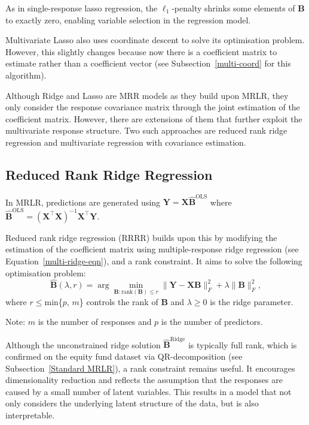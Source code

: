 \documentclass[11pt]{report} %
\begin{document}
\noindent As in single-response lasso regression, the \(\ell_1\)-penalty shrinks some elements of \(\mathbf{B}\) to exactly zero, enabling variable selection in the regression model.

Multivariate Lasso also uses coordinate descent to solve its optimisation problem. However, this slightly changes because now there is a coefficient matrix to estimate rather than a coefficient vector (see Subsection~\ref{multi-coord} for this algorithm).

Although Ridge and Lasso are MRR models as they build upon MRLR, they only consider the response covariance matrix through the joint estimation of the coefficient matrix. However, there are extensions of them that further exploit the multivariate response structure. Two such approaches are reduced rank ridge regression and multivariate regression with covariance estimation.

\subsection{Reduced Rank Ridge Regression}
In MRLR, predictions are generated using $\mathbf{Y}=\mathbf{X}\hat{\mathbf{B}}^{\text{OLS}}$ where $\mathbf{\hat{B}}^\text{OLS} = \mathbf{(X^\top X)}^{-1}\mathbf{X^\top Y}$.

Reduced rank ridge regression (RRRR) builds upon this by modifying the estimation of the coefficient matrix using multiple-response ridge regression (see Equation~\ref{multi-ridge-eqn}), and a rank constraint. It aims to solve the following optimisation problem:
\begin{equation}
\hat{\mathbf{B}}(\lambda, r) = \arg \min_{\mathbf{B}: \text{rank}(\mathbf{B}) \leq r} \|\mathbf{Y} - \mathbf{X} \mathbf{B}\|_F^2 + \lambda \|\mathbf{B}\|_F^2,
\label{RRRR OG}
\end{equation}
where $r\leq \text{min}$\{$p$, $m$\} controls the rank of $\mathbf{B}$ and $\lambda \geq 0$ is the ridge parameter. 

\noindent Note: $m$ is the number of responses and $p$ is the number of predictors.

Although the unconstrained ridge solution \(\hat{\mathbf{B}}^{\text{Ridge}}\) is typically full rank, which is confirmed on the equity fund dataset via QR-decomposition (see Subsection~\ref{Standard MRLR}), a rank constraint remains useful. It encourages dimensionality reduction and reflects the assumption that the responses are caused by a small number of latent variables.\cite{mukherjee2011reduced} This results in a model that not only considers the underlying latent structure of the data, but is also interpretable.
\end{document}

